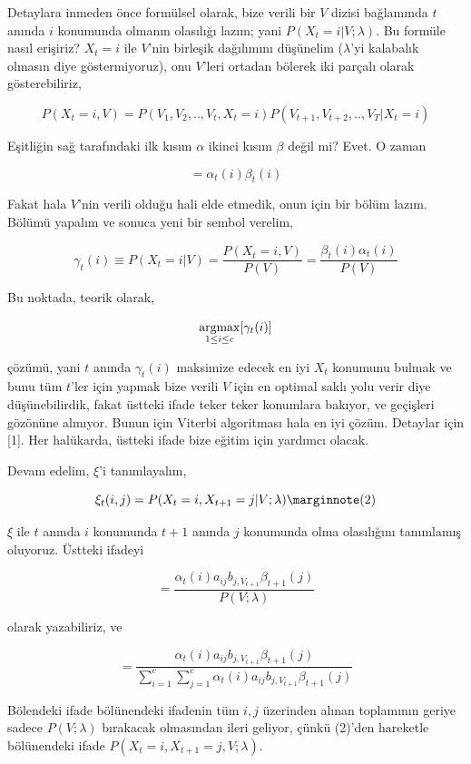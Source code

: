 \documentclass[12pt,fleqn]{article}\usepackage{../../common}
\begin{document}
Detaylara inmeden önce formülsel olarak, bize verili bir $V$ dizisi
bağlamında $t$ anında $i$ konumunda olmanın olasılığı lazım; yani 
$P(X_t = i | V; \lambda)$. Bu formüle nasıl erişiriz? $X_t = i$ ile $V$'nin
birleşik dağılımını düşünelim ($\lambda$'yi kalabalık olmasın diye
göstermiyoruz), onu $V$'leri ortadan bölerek iki parçalı olarak 
gösterebiliriz,

$$ P(X_t = i, V) = P( V_1,V_2,..,V_t,X_t=i) P (V_{t+1},V_{t+2},..,V_T | X_t=i )
$$

Eşitliğin sağ tarafındaki ilk kısım $\alpha$ ikinci kısım $\beta$ değil mi?
Evet. O zaman 

$$  = \alpha_t(i) \beta_t(i) $$

Fakat hala $V$'nin verili olduğu hali elde etmedik, onun için bir bölüm
lazım. Bölümü yapalım ve sonuca yeni bir sembol verelim,

$$ 
\gamma_t(i) \equiv P(X_t = i | V) = 
\frac{P(X_t = i, V) }{P(V)} = 
\frac{\beta_t(i)\alpha_t(i)}{ P(V)} 
$$

Bu noktada, teorik olarak, 

$$ \mathop{\mathrm{argmax}}_{1 \le i \le c} [ \gamma_t(i) ] $$

çözümü, yani $t$ anında $\gamma_t(i)$ maksimize edecek en iyi $X_t$
konumunu bulmak ve bunu tüm $t$'ler için yapmak bize verili $V$ için en
optimal saklı yolu verir diye düşünebilirdik, fakat üstteki ifade teker
teker konumlara bakıyor, ve geçişleri gözönüne almıyor. Bunun için Viterbi
algoritması hala en iyi çözüm. Detaylar için [1]. Her halükarda, üstteki
ifade bize eğitim için yardımcı olacak. 

Devam edelim, $\xi$'i tanımlayalım,

$$ \xi_t(i,j) = P(X_t = i, X_{t+1}= j | V; \lambda) 
\mlabel{2}
$$

$\xi$ ile $t$ anında $i$ konumunda $t+1$ anında $j$ konumunda olma
olasılığını tanımlamış oluyoruz. Üstteki ifadeyi 

$$  = \frac{\alpha_t(i)a_{ij}b_{j,V_{t+1}}\beta_{t+1}(j)  }{P(V;\lambda)}$$

olarak yazabiliriz, ve

$$  
= \frac{\alpha_t(i)a_{ij}b_{j,V_{t+1}}\beta_{t+1}(j)  }
{\sum_{i=1}^{c}\sum_{j=1}^{c} \alpha_t(i)a_{ij}b_{j,V_{t+1}}\beta_{t+1}(j)  }
$$

Bölendeki ifade bölünendeki ifadenin tüm $i,j$ üzerinden alınan toplamının
geriye sadece $P(V;\lambda)$ bırakacak olmasından ileri geliyor, çünkü (2)'den
hareketle bölünendeki ifade $P(X_t = i, X_{t+1}= j, V; \lambda) $. 
\end{document}
